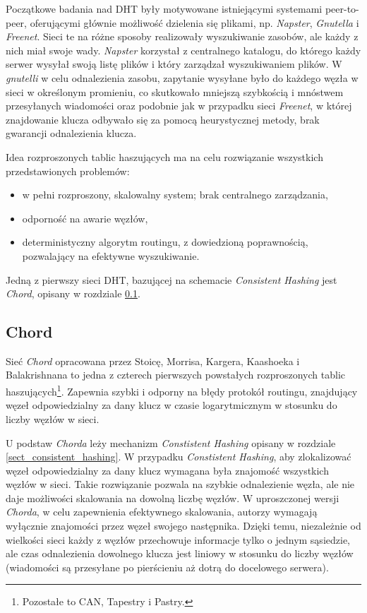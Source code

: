 \documentclass[a4paper,11pt]{scrartcl}
\begin{document}
Początkowe badania nad DHT były motywowane istniejącymi systemami peer-to-peer, oferującymi głównie możliwość dzielenia się plikami, np. \textit{Napster}, \textit{Gnutella} i \textit{Freenet}. Sieci te na różne sposoby realizowały wyszukiwanie zasobów, ale każdy z nich miał swoje wady. \textit{Napster} korzystał z centralnego katalogu, do którego każdy serwer wysyłał swoją listę plików i który zarządzał wyszukiwaniem plików. W \textit{gnutelli} w celu odnalezienia zasobu, zapytanie wysyłane było do każdego węzła w sieci w określonym promieniu, co skutkowało mniejszą szybkością i mnóstwem przesyłanych wiadomości oraz podobnie jak w przypadku sieci \textit{Freenet}, w której znajdowanie klucza odbywało się za pomocą heurystycznej metody, brak gwarancji odnalezienia klucza.

Idea rozproszonych tablic haszujących ma na celu rozwiązanie wszystkich przedstawionych problemów:
\begin{itemize}
  \item w pełni rozproszony, skalowalny system; brak centralnego zarządzania,
  \item odporność na awarie węzłów,
  \item deterministyczny algorytm routingu, z dowiedzioną poprawnością, pozwalający na efektywne wyszukiwanie. 
\end{itemize} 

Jedną z pierwszy sieci DHT, bazującej na schemacie \textit{Consistent Hashing} jest \textit{Chord}, opisany w rozdziale \ref{sect_dht_chord}.

\subsection{Chord}
\label{sect_dht_chord}
Sieć \textit{Chord} opracowana przez Stoicę, Morrisa, Kargera, Kaashoeka i Balakrishnana  \cite{stoica2001chord} to jedna z czterech pierwszych powstałych rozproszonych tablic haszujących\footnote{Pozostałe to CAN\cite{ratnasamy2001scalable}, Tapestry \cite{zhao2001tapestry} i Pastry\cite{rowstron2001pastry}.}. Zapewnia szybki i odporny na błędy protokół routingu, znajdujący węzeł odpowiedzialny za dany klucz w czasie logarytmicznym w stosunku do liczby węzłów w sieci.

U podstaw \textit{Chorda} leży mechanizm \textit{Constistent Hashing} opisany w rozdziale \ref{sect_consistent_hashing}. W przypadku \textit{Constistent Hashing}, aby zlokalizować węzeł odpowiedzialny za dany klucz wymagana była znajomość wszystkich węzłów w sieci. Takie rozwiązanie pozwala na szybkie odnalezienie węzła, ale nie daje możliwości skalowania na dowolną liczbę węzłów. W uproszczonej wersji \textit{Chorda}, w celu zapewnienia efektywnego skalowania, autorzy wymagają wyłącznie znajomości przez węzeł swojego następnika. Dzięki temu, niezależnie od wielkości sieci każdy z węzłów przechowuje informacje tylko o jednym sąsiedzie, ale czas odnalezienia dowolnego klucza jest liniowy w stosunku do liczby węzłów (wiadomości są przesyłane po pierścieniu aż dotrą do docelowego serwera).
\end{document}
